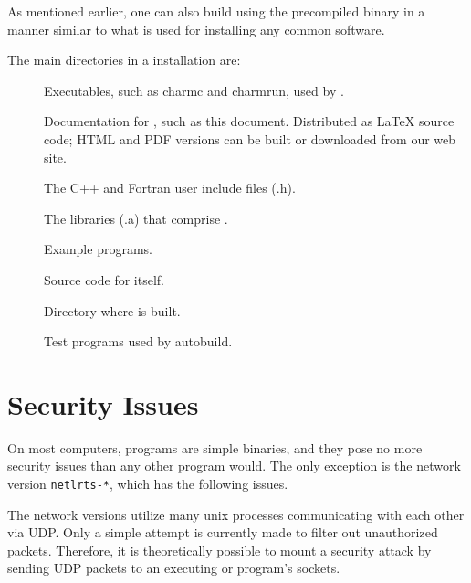 As mentioned earlier, one can also build \charmpp{} using the precompiled binary
in a manner similar to what is used for installing any common software.


The main directories in a \charmpp{} installation are:

\begin{description}
\item[]
Executables, such as charmc and charmrun,
used by \charmpp{}.

\item[]
Documentation for \charmpp{}, such as this
document.  Distributed as LaTeX source code; HTML and PDF versions
can be built or downloaded from our web site.

\item[]
The \charmpp{} C++ and Fortran user include files (.h).

\item[]
The libraries (.a) that comprise \charmpp{}.

\item[]
Example \charmpp{} programs.

\item[]
Source code for \charmpp{} itself.

\item[]
Directory where \charmpp{} is built.


\item[]
Test \charmpp{} programs used by autobuild.

\end{description}

\section{Security Issues}

On most computers, \charmpp{} programs are simple binaries, and they pose
no more security issues than any other program would.  The only exception
is the network version {\tt netlrts-*}, which has the following issues. 

The network versions utilize many unix processes communicating with
each other via UDP.  Only a simple attempt is currently made to filter out
unauthorized packets.  Therefore, it is theoretically possible to
mount a security attack by sending UDP packets to an executing
\converse{} or \charmpp{} program's sockets.

